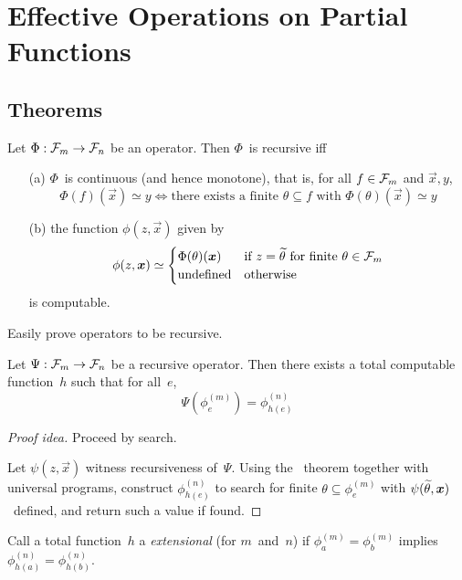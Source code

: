 %
%
%
\section{Effective Operations on Partial Functions}
\subsection*{Theorems}
\begin{thm}
Let \(\Phi:\mathcal{F}_m\to\mathcal{F}_n\) be an operator. Then \(\Phi\)~is recursive iff
\begin{enumerate}[itemsep=0pt]
\item[(a)] \(\Phi\)~is continuous (and hence monotone), that is, for all \(f\in\mathcal{F}_m\) and \(\vec{x},y\),
\[\Phi(f)(\vec{x})\simeq y\iff\text{there exists a finite }\theta\subseteq f\text{ with }\Phi(\theta)(\vec{x})\simeq y\]
\item[(b)] the function \(\phi(z,\vec{x})\) given by
\[\phi(z,\boldsymbol{x})\simeq\begin{cases}
\Phi(\theta)(\boldsymbol{x})&\text{if }z=\widetilde{{\theta}}\text{ for finite }\theta\in\mathcal{F}_m\\
\text{undefined}&\text{otherwise}
\end{cases}\]
is computable.
\end{enumerate}
\end{thm}
\begin{app}
Easily prove operators to be recursive.
\end{app}

\begin{thm}
Let \(\Psi:\mathcal{F}_m\to\mathcal{F}_n\) be a recursive operator. Then there exists a total computable function~\(h\) such that for all~\(e\),
\[\Psi(\phi_e^{(m)})=\phi_{h(e)}^{(n)}\]
\end{thm}
\begin{proof}[Proof idea]
Proceed by search.

Let \(\psi(z,\vec{x})\) witness recursiveness of~\(\Psi\). Using the \smn\ theorem together with universal programs, construct \(\phi_{h(e)}^{(n)}\) to search for finite \(\theta\subseteq\phi_e^{(m)}\) with \(\psi(\widetilde{{\theta}},\boldsymbol{x})\)~defined, and return such a value if found.
\end{proof}

\noindent Call a total function~\(h\) a \emph{extensional} (for \(m\)~and~\(n\)) if \(\phi_a^{(m)}=\phi_b^{(m)}\) implies \(\phi_{h(a)}^{(n)}=\phi_{h(b)}^{(n)}\).

